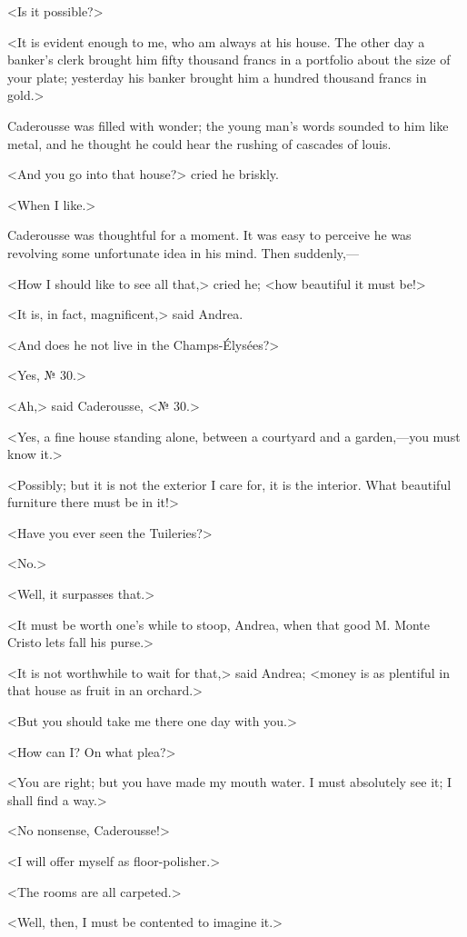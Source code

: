  <Is it possible?> 

 <It is evident enough to me, who am always at his house. The other day a banker's clerk brought him fifty thousand francs in a portfolio about the size of your plate; yesterday his banker brought him a hundred thousand francs in gold.> 

 Caderousse was filled with wonder; the young man's words sounded to him like metal, and he thought he could hear the rushing of cascades of louis. 

 <And you go into that house?> cried he briskly. 

 <When I like.> 

 Caderousse was thoughtful for a moment. It was easy to perceive he was revolving some unfortunate idea in his mind. Then suddenly,— 

 <How I should like to see all that,> cried he; <how beautiful it must be!> 

 <It is, in fact, magnificent,> said Andrea. 

 <And does he not live in the Champs-Élysées?> 

 <Yes, № 30.> 

 <Ah,> said Caderousse, <№ 30.> 

 <Yes, a fine house standing alone, between a courtyard and a garden,—you must know it.> 

 <Possibly; but it is not the exterior I care for, it is the interior. What beautiful furniture there must be in it!> 

 <Have you ever seen the Tuileries?> 

 <No.> 

 <Well, it surpasses that.> 

 <It must be worth one's while to stoop, Andrea, when that good M. Monte Cristo lets fall his purse.> 

 <It is not worthwhile to wait for that,> said Andrea; <money is as plentiful in that house as fruit in an orchard.> 

 <But you should take me there one day with you.> 

 <How can I? On what plea?> 

 <You are right; but you have made my mouth water. I must absolutely see it; I shall find a way.> 

 <No nonsense, Caderousse!> 

 <I will offer myself as floor-polisher.> 

 <The rooms are all carpeted.> 

 <Well, then, I must be contented to imagine it.> 

